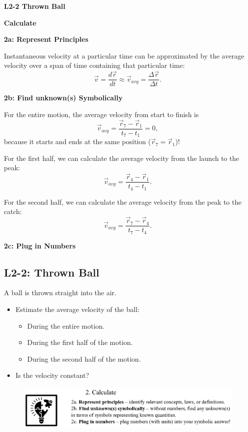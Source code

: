 \documentclass[]{article}
\begin{document}
\newpage
\begin{TeacherMargin}
\noindent\textbf{L2-2 Thrown Ball}

\noindent\textbf{Calculate}

\noindent\textbf{2a: Represent Principles}

Instantaneous velocity at a particular time can be approximated by the average velocity over a span of time containing that particular time:
\[
\vec{v} = \frac{d\vec{r}}{dt} \approx \vec{v}_{avg} = \frac{\Delta\vec{r}}{\Delta t}.
\]

\noindent\textbf{2b: Find unknown(s) Symbolically}

For the entire motion, the average velocity from start to finish is
\[
\vec{v}_{avg} = \frac{\vec{r}_{7}-\vec{r}_{1}}{t_{7}-t_{1}} = 0,
\]
because it starts and ends at the same position ($\vec{r}_{7}=\vec{r}_{1}$)!

For the first half, we can calculate the average velocity from the launch to the peak:
\[
\vec{v}_{avg} = \frac{\vec{r}_{4}-\vec{r}_{1}}{t_{4}-t_{1}}.
\]

For the second half, we can calculate the average velocity from the peak to the catch:
\[
\vec{v}_{avg} = \frac{\vec{r}_{7}-\vec{r}_{4}}{t_{7}-t_{4}}.
\]

\noindent\textbf{2c: Plug in Numbers}


\end{TeacherMargin}
\begin{PresentSpace}
	\vspace{-0.5cm}
	\section*{L2-2: Thrown Ball}
	\vspace{-0.2cm}
	A ball is thrown straight into the air.
	\begin{itemize}
		\item Estimate the average velocity of the ball:
		\begin{itemize}
			\item During the entire motion.
			\item During the first half of the motion.
			\item During the second half of the motion.
		\end{itemize}
		\item Is the velocity constant?
	\end{itemize}
	\vspace{11cm}
	\begin{figure}[h]
		\centering
		\includegraphics[scale=0.4]{Calculate.png}
	\end{figure}
\end{PresentSpace}
\end{document}
